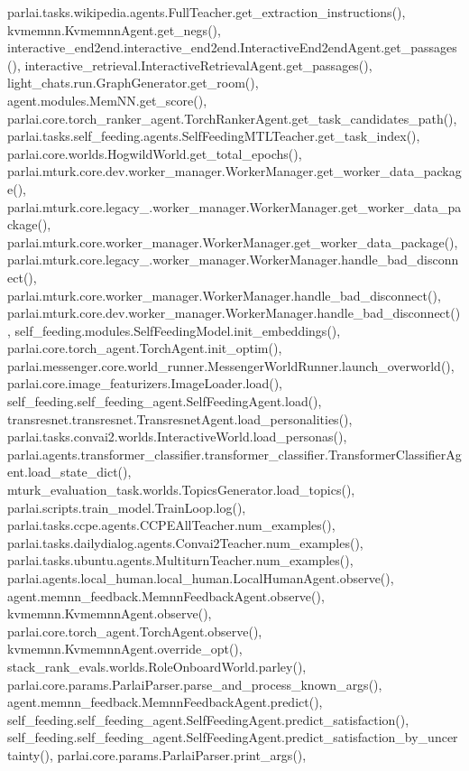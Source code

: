 parlai.\+tasks.\+wikipedia.\+agents.\+Full\+Teacher.\+get\+\_\+extraction\+\_\+instructions(), kvmemnn.\+Kvmemnn\+Agent.\+get\+\_\+negs(), interactive\+\_\+end2end.\+interactive\+\_\+end2end.\+Interactive\+End2end\+Agent.\+get\+\_\+passages(), interactive\+\_\+retrieval.\+Interactive\+Retrieval\+Agent.\+get\+\_\+passages(), light\+\_\+chats.\+run.\+Graph\+Generator.\+get\+\_\+room(), agent.\+modules.\+Mem\+N\+N.\+get\+\_\+score(), parlai.\+core.\+torch\+\_\+ranker\+\_\+agent.\+Torch\+Ranker\+Agent.\+get\+\_\+task\+\_\+candidates\+\_\+path(), parlai.\+tasks.\+self\+\_\+feeding.\+agents.\+Self\+Feeding\+M\+T\+L\+Teacher.\+get\+\_\+task\+\_\+index(), parlai.\+core.\+worlds.\+Hogwild\+World.\+get\+\_\+total\+\_\+epochs(), parlai.\+mturk.\+core.\+dev.\+worker\+\_\+manager.\+Worker\+Manager.\+get\+\_\+worker\+\_\+data\+\_\+package(), parlai.\+mturk.\+core.\+legacy\+\_.\+worker\+\_\+manager.\+Worker\+Manager.\+get\+\_\+worker\+\_\+data\+\_\+package(), parlai.\+mturk.\+core.\+worker\+\_\+manager.\+Worker\+Manager.\+get\+\_\+worker\+\_\+data\+\_\+package(), parlai.\+mturk.\+core.\+legacy\+\_.\+worker\+\_\+manager.\+Worker\+Manager.\+handle\+\_\+bad\+\_\+disconnect(), parlai.\+mturk.\+core.\+worker\+\_\+manager.\+Worker\+Manager.\+handle\+\_\+bad\+\_\+disconnect(), parlai.\+mturk.\+core.\+dev.\+worker\+\_\+manager.\+Worker\+Manager.\+handle\+\_\+bad\+\_\+disconnect(), self\+\_\+feeding.\+modules.\+Self\+Feeding\+Model.\+init\+\_\+embeddings(), parlai.\+core.\+torch\+\_\+agent.\+Torch\+Agent.\+init\+\_\+optim(), parlai.\+messenger.\+core.\+world\+\_\+runner.\+Messenger\+World\+Runner.\+launch\+\_\+overworld(), parlai.\+core.\+image\+\_\+featurizers.\+Image\+Loader.\+load(), self\+\_\+feeding.\+self\+\_\+feeding\+\_\+agent.\+Self\+Feeding\+Agent.\+load(), transresnet.\+transresnet.\+Transresnet\+Agent.\+load\+\_\+personalities(), parlai.\+tasks.\+convai2.\+worlds.\+Interactive\+World.\+load\+\_\+personas(), parlai.\+agents.\+transformer\+\_\+classifier.\+transformer\+\_\+classifier.\+Transformer\+Classifier\+Agent.\+load\+\_\+state\+\_\+dict(), mturk\+\_\+evaluation\+\_\+task.\+worlds.\+Topics\+Generator.\+load\+\_\+topics(), parlai.\+scripts.\+train\+\_\+model.\+Train\+Loop.\+log(), parlai.\+tasks.\+ccpe.\+agents.\+C\+C\+P\+E\+All\+Teacher.\+num\+\_\+examples(), parlai.\+tasks.\+dailydialog.\+agents.\+Convai2\+Teacher.\+num\+\_\+examples(), parlai.\+tasks.\+ubuntu.\+agents.\+Multiturn\+Teacher.\+num\+\_\+examples(), parlai.\+agents.\+local\+\_\+human.\+local\+\_\+human.\+Local\+Human\+Agent.\+observe(), agent.\+memnn\+\_\+feedback.\+Memnn\+Feedback\+Agent.\+observe(), kvmemnn.\+Kvmemnn\+Agent.\+observe(), parlai.\+core.\+torch\+\_\+agent.\+Torch\+Agent.\+observe(), kvmemnn.\+Kvmemnn\+Agent.\+override\+\_\+opt(), stack\+\_\+rank\+\_\+evals.\+worlds.\+Role\+Onboard\+World.\+parley(), parlai.\+core.\+params.\+Parlai\+Parser.\+parse\+\_\+and\+\_\+process\+\_\+known\+\_\+args(), agent.\+memnn\+\_\+feedback.\+Memnn\+Feedback\+Agent.\+predict(), self\+\_\+feeding.\+self\+\_\+feeding\+\_\+agent.\+Self\+Feeding\+Agent.\+predict\+\_\+satisfaction(), self\+\_\+feeding.\+self\+\_\+feeding\+\_\+agent.\+Self\+Feeding\+Agent.\+predict\+\_\+satisfaction\+\_\+by\+\_\+uncertainty(), parlai.\+core.\+params.\+Parlai\+Parser.\+print\+\_\+args(), 